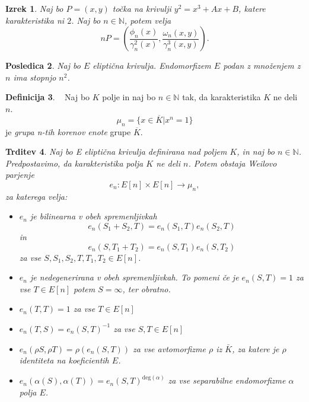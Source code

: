 \documentclass[12pt,a4paper,twoside]{article}
\theoremstyle{definition} %
\newtheorem{definicija}{Definicija}[section]
\theoremstyle{plain} %
\newtheorem{izrek}[definicija]{Izrek}
\newtheorem{trditev}[definicija]{Trditev}
\newtheorem{posledica}[definicija]{Posledica}
\numberwithin{equation}{section}  %
\newcommand{\N}{\mathbb N}
\begin{document}
\begin{izrek}
Naj bo $P = (x,y)$ točka na krivulji $y^2 = x^3+Ax+B$, katere karakteristika ni $2$. Naj bo $n\in \N$, potem velja
$$nP = \left( \frac{\phi_n(x)}{\gamma^2_n(x)}, \frac{\omega_n(x,y)}{\gamma^3_n(x,y)}\right).$$


\end{izrek}

\begin{posledica}
Naj bo $E$ eliptična krivulja. Endomorfizem $E$ podan z množenjem z $n$ ima stopnjo $n^2$.
\end{posledica}


\begin{definicija}~
Naj bo $K$ polje in naj bo $n \in \N$ tak, da karakteristika $K$ ne deli $n$.
$$\mu_n = \{ x \in \overline{K} | x^n = 1 \}$$
je \emph{grupa n-tih korenov enote} grupe $\overline{K}$.
\end{definicija}

\begin{trditev}
\label{trd-WeilPar}
Naj bo E eliptična krivulja definirana nad poljem $K$, in naj bo $n \in \N$. Predpostavimo, da karakteristika polja $K$ ne deli $n$. Potem obstaja Weilovo parjenje
$$e_n:E[n] \times E[n] \rightarrow \mu_n,$$
za katerega velja:
\begin{itemize}
\item $e_n$ je bilinearna v obeh spremenljivkah
$$e_n(S_1+S_2,T) = e_n(S_1,T)e_n(S_2,T)$$
in
$$e_n(S,T_1+T_2) = e_n(S,T_1)e_n(S,T_2)$$
za vse $S,S_1,S_2,T,T_1,T_2 \in E[n]$.
\item $e_n$ je nedegenerirana v obeh spremenljivkah. To pomeni če je $e_n(S,T) = 1$ za vse $T \in E[n]$ potem $S = \infty$, ter obratno.

\item $e_n(T,T) = 1$ za vse $T \in E[n]$

\item $e_n(T,S) = e_n(S,T)^{-1}$ za vse $S,T \in E[n]$

\item $e_n(\rho S,\rho T) = \rho(e_n(S,T))$ za vse avtomorfizme $\rho$ iz $\bar{K}$, za katere je $\rho$ identiteta na koeficientih $E$.

\item $e_n(\alpha(S),\alpha(T)) = e_n(S,T)^{\text{deg}(\alpha)}$ za vse separabilne endomorfizme $\alpha$ polja $E$.
\end{itemize}

\end{trditev}
\end{document}
